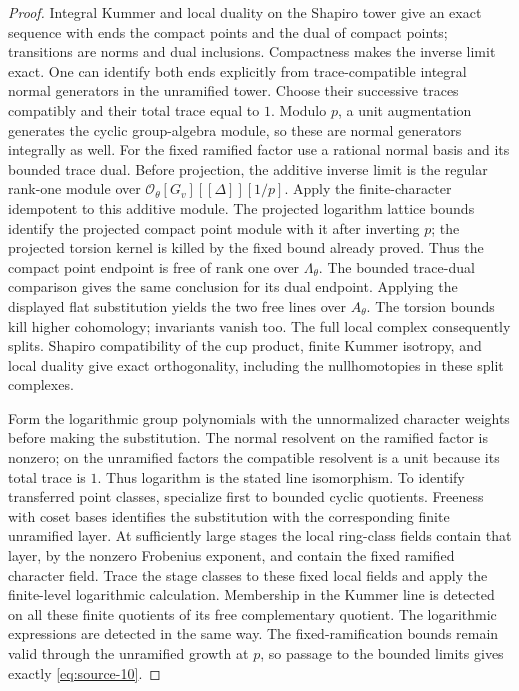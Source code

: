 \begin{proof}
Integral Kummer and local duality on the Shapiro tower give an
exact sequence with ends the compact points and the dual of compact
points; transitions are norms and dual inclusions.  Compactness
makes the inverse limit exact.  One can identify both ends
explicitly from trace-compatible
integral normal generators in the unramified tower.  Choose their
successive traces compatibly and their total trace equal to \(1\).
Modulo \(p\), a unit augmentation generates the cyclic group-algebra
module, so these are normal generators integrally as well.
For the fixed ramified factor use a rational normal basis and its
bounded trace dual.  Before projection, the additive inverse limit
is the regular rank-one module over
\(\mathcal O_\theta[G_v][[\Delta]][1/p]\).  Apply the
finite-character idempotent to this additive module.  The projected
logarithm lattice bounds identify the projected compact point
module with it after inverting \(p\); the projected torsion kernel
is killed by the fixed bound already proved.  Thus the compact
point endpoint is free of rank one over \(\Lambda_\theta\).
The bounded trace-dual comparison gives the same conclusion for its
dual endpoint.  Applying the displayed flat substitution yields the
two free lines over \(A_\theta\).  The torsion bounds kill higher cohomology;
invariants vanish too.  The full local complex consequently splits.
Shapiro compatibility of the cup product, finite Kummer isotropy,
and local duality give exact orthogonality, including the
nullhomotopies in these split complexes.

Form the logarithmic group polynomials with the unnormalized
character weights before making the substitution.  The normal
resolvent on the ramified factor is nonzero; on the unramified
factors the compatible resolvent is a unit because its total trace
is \(1\).  Thus logarithm is the stated line isomorphism.
To identify transferred point classes, specialize first to bounded
cyclic quotients.  Freeness with coset bases identifies the
substitution with the corresponding finite unramified layer.
At sufficiently large stages the local ring-class fields contain
that layer, by the nonzero Frobenius exponent, and contain the
fixed ramified character field.  Trace the stage classes to these
fixed local fields and apply the finite-level logarithmic
calculation.  Membership in the Kummer line is detected on all
these finite quotients of its free complementary quotient.
The logarithmic expressions are detected in the same way.
The fixed-ramification bounds remain valid through the unramified
growth at \(p\), so passage to the bounded limits gives exactly
\eqref{eq:source-10}.
\end{proof}

